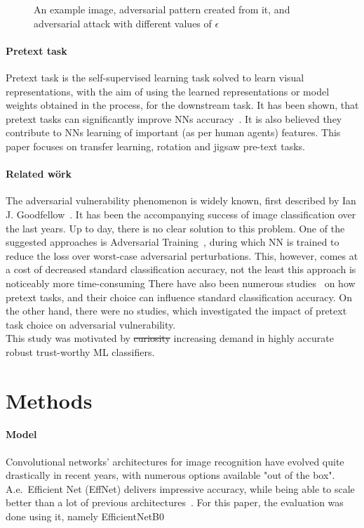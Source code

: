 \begin{figure}[h]
    \caption{An example image, adversarial pattern created from it, and adversarial attack with different values of $\epsilon$}
    \label{fig:fig-adv}
\end{figure}

\paragraph{Pretext task}
Pretext task is the self-supervised learning task solved to learn visual representations,
with the aim of using the learned representations or model weights obtained in the process, for the downstream task.
It has been shown, that pretext tasks can significantly improve NNs accuracy~\cite{kolesnikov2019revisiting}.
It is also believed they contribute to NNs learning of important (as per human agents) features.
This paper focuses on transfer learning, rotation and jigsaw pre-text tasks.


\paragraph{Related wörk}
The adversarial vulnerability phenomenon is widely known, first described by Ian J. Goodfellow~\cite{goodfellow2015explaining}.
It has been the accompanying success of image classification over the last years.
Up to day, there is no clear solution to this problem.
One of the suggested approaches is Adversarial Training~\cite{https://doi.org/10.48550/arxiv.1805.12152},
during which NN is trained to reduce the loss over worst-case adversarial perturbations.
This, however, comes at a cost of decreased standard classification accuracy, not the least this approach is noticeably more time-consuming
There have also been numerous studies~\cite{kolesnikov2019revisiting,DBLP:journals/corr/NorooziF16,DBLP:journals/corr/abs-1912-01991}
on how pretext tasks, and their choice can influence standard classification accuracy.
On the other hand, there were no studies, which investigated the impact of pretext task choice on
adversarial vulnerability. \\
This study was motivated by \st{curiosity} increasing demand in highly accurate robust trust-worthy ML classifiers.



\section{Methods}

\paragraph{Model}
Convolutional networks' architectures for image recognition have evolved quite drastically in recent years,
with numerous options available "out of the box".
A.e.\ Efficient Net (EffNet) delivers impressive accuracy, while being able to scale better than a lot of
previous architectures~\cite{DBLP:journals/corr/abs-1905-11946}.
For this paper, the evaluation was done using it, namely EfficientNetB0~\cite{KerasEffNet}

